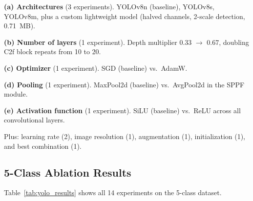 \documentclass{article}
\begin{document}
\textbf{(a) Architectures} (3 experiments). YOLOv8n (baseline), YOLOv8s, YOLOv8m, plus a custom lightweight model (halved channels, 2-scale detection, 0.71~MB).

\textbf{(b) Number of layers} (1 experiment).
\label{sec:exp_layers}
Depth multiplier 0.33 $\to$ 0.67, doubling C2f block repeats from 10 to 20.

\textbf{(c) Optimizer} (1 experiment). SGD (baseline) vs.\ AdamW.

\textbf{(d) Pooling} (1 experiment).
\label{sec:exp_pooling}
MaxPool2d (baseline) vs.\ AvgPool2d in the SPPF module.

\textbf{(e) Activation function} (1 experiment).
\label{sec:exp_activation}
SiLU (baseline) vs.\ ReLU across all convolutional layers.

Plus: learning rate (2), image resolution (1), augmentation (1), initialization (1), and best combination (1).

\subsection{5-Class Ablation Results}

Table~\ref{tab:yolo_results} shows all 14 experiments on the 5-class dataset.
\end{document}
